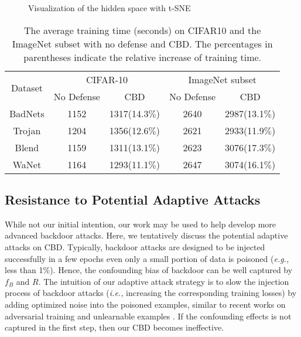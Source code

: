 \begin{figure*}[t]
	\centering
	\caption{Visualization of the hidden space with t-SNE}
	\label{tsne}
\end{figure*}

\begin{table}[t]
  \caption{The average training time (seconds) on CIFAR10 and the ImageNet subset with no defense and CBD. The percentages in parentheses indicate the relative increase of training time.}
\scriptsize
  \centering
  \begin{tabular}{c|cccc}
    \toprule
     \multirow{2}{*}{Dataset} & \multicolumn{2}{c}{CIFAR-10} & \multicolumn{2}{c}{ImageNet subset} \\\cline{2-5} 
 & No Defense & CBD & No Defense & CBD \\
    \hline
    BadNets& 1152& 1317{\tiny(14.3$\%$)}&2640 & 2987{\tiny(13.1$\%$)}\\
    Trojan& 1204& 1356{\tiny(12.6$\%$)}& 2621& 2933{\tiny(11.9$\%$)}\\
    Blend&1159 & 1311{\tiny(13.1$\%$)}& 2623& 3076{\tiny(17.3$\%$)}\\
    WaNet&1164& 1293{\tiny(11.1$\%$)}& 2647& 3074{\tiny(16.1$\%$)}\\ 
    \bottomrule
  \end{tabular}
  \label{time cost}
\end{table}
\subsection{Resistance to Potential Adaptive Attacks}\label{adaptive attack}
While not our initial intention, our work may be used to help develop more advanced backdoor attacks. Here, we tentatively discuss the potential adaptive attacks on CBD. Typically, backdoor attacks are designed to be injected successfully in a few epochs even only a small portion of data is poisoned (\emph{e.g.,} less than 1$\%$). Hence, the confounding bias of backdoor can be well captured by $f_B$ and $R$. 
The intuition of our adaptive attack strategy is to slow the injection process of backdoor attacks (\emph{i.e.,} increasing the corresponding training losses) by adding optimized noise into the poisoned examples, similar to recent works on adversarial training \cite{madry2017towards} and unlearnable examples \cite{huang2021unlearnable}.
If the confounding effects is not captured in the first step, then our CBD becomes ineffective. 

